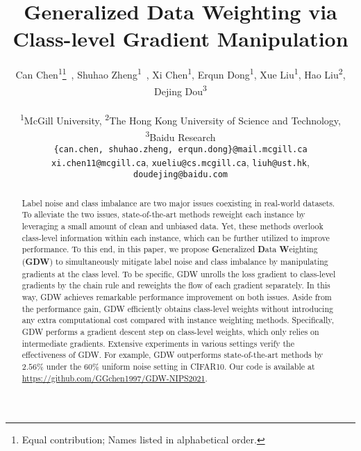 \documentclass{article}
\title{Generalized Data Weighting via Class-level Gradient Manipulation}
\author{%
  Can Chen\textsuperscript{1}\thanks{Equal contribution; Names listed in alphabetical order.}~, Shuhao Zheng\textsuperscript{1}\samethanks~, Xi Chen\textsuperscript{1}, Erqun Dong\textsuperscript{1}, Xue Liu\textsuperscript{1}, Hao Liu\textsuperscript{2}, Dejing Dou\textsuperscript{3}\\
  \\
  \textsuperscript{1}McGill University, \textsuperscript{2}The Hong Kong University of Science and Technology, \textsuperscript{3}Baidu Research\\
  \texttt{\{can.chen, shuhao.zheng, erqun.dong\}@mail.mcgill.ca}\\ \texttt{xi.chen11@mcgill.ca},
  \texttt{xueliu@cs.mcgill.ca}, \texttt{liuh@ust.hk}, \texttt{doudejing@baidu.com} \\
}
\begin{document}
\maketitle

\begin{abstract}
Label noise and class imbalance are two major issues coexisting in real-world datasets.
%
To alleviate the two issues, state-of-the-art methods reweight each instance by leveraging a small amount of clean and unbiased data.
%
Yet, these methods overlook class-level information within each instance, which can be further utilized to improve performance.
%
To this end, in this paper, we propose \textbf{G}eneralized \textbf{D}ata \textbf{W}eighting (\textbf{GDW}) to simultaneously mitigate label noise and class imbalance by manipulating gradients at the class level.
%
To be specific, GDW unrolls the loss gradient to class-level gradients by the chain rule and reweights the flow of each gradient separately.
%
In this way, GDW achieves remarkable performance improvement on both issues. 
%
Aside from the performance gain, GDW efficiently obtains class-level weights without introducing any extra computational cost compared with instance weighting methods.
%
Specifically, GDW performs a gradient descent step on class-level weights, which only relies on intermediate gradients.
%
Extensive experiments in various settings verify the effectiveness of GDW.
%
For example, GDW outperforms state-of-the-art methods by $2.56\%$ under the $60\%$ uniform noise setting in CIFAR10. 
%
Our code is available at \url{https://github.com/GGchen1997/GDW-NIPS2021}.
\end{abstract}








\end{document}
